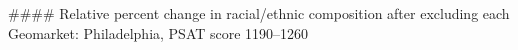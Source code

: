 #### Relative percent change in racial/ethnic composition after excluding each Geomarket: Philadelphia, PSAT score 1190–1260
